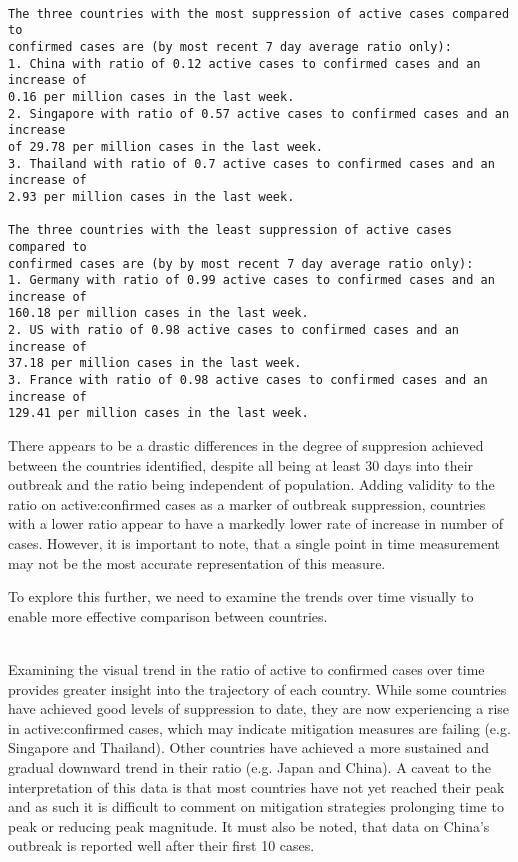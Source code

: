 \documentclass[8pt]{article}
\begin{document}
    \begin{Verbatim}[commandchars=\\\{\}]

The three countries with the most suppression of active cases compared to
confirmed cases are (by most recent 7 day average ratio only):
1. China with ratio of 0.12 active cases to confirmed cases and an increase of
0.16 per million cases in the last week.
2. Singapore with ratio of 0.57 active cases to confirmed cases and an increase
of 29.78 per million cases in the last week.
3. Thailand with ratio of 0.7 active cases to confirmed cases and an increase of
2.93 per million cases in the last week.

The three countries with the least suppression of active cases compared to
confirmed cases are (by by most recent 7 day average ratio only):
1. Germany with ratio of 0.99 active cases to confirmed cases and an increase of
160.18 per million cases in the last week.
2. US with ratio of 0.98 active cases to confirmed cases and an increase of
37.18 per million cases in the last week.
3. France with ratio of 0.98 active cases to confirmed cases and an increase of
129.41 per million cases in the last week.
    \end{Verbatim}
There appears to be a drastic differences in the degree of suppresion achieved between the countries identified, despite all being at least 30 days into their outbreak and the ratio being independent of population. Adding validity to the ratio on active:confirmed cases as a marker of outbreak suppression, countries with a lower ratio appear to have a markedly lower rate of increase in number of cases. However, it is important to note, that a single point in time measurement may not be the most accurate representation of this measure.


To explore this further, we need to examine the trends over time visually to enable more effective comparison between countries.


    \begin{center}
    \end{center}
    { \hspace*{\fill} \\}
    Examining the visual trend in the ratio of active to confirmed cases over time provides greater insight into the trajectory of each country. While some countries have achieved good levels of suppression to date, they are now experiencing a rise in active:confirmed cases, which may indicate mitigation measures are failing (e.g. Singapore and Thailand). Other countries have achieved a more sustained and gradual downward trend in their ratio (e.g. Japan and China). A caveat to the interpretation of this data is that most countries have not yet reached their peak and as such it is difficult to comment on mitigation strategies prolonging time to peak or reducing peak magnitude. It must also be noted, that data on China's outbreak is reported well after their first 10 cases.
\end{document}

